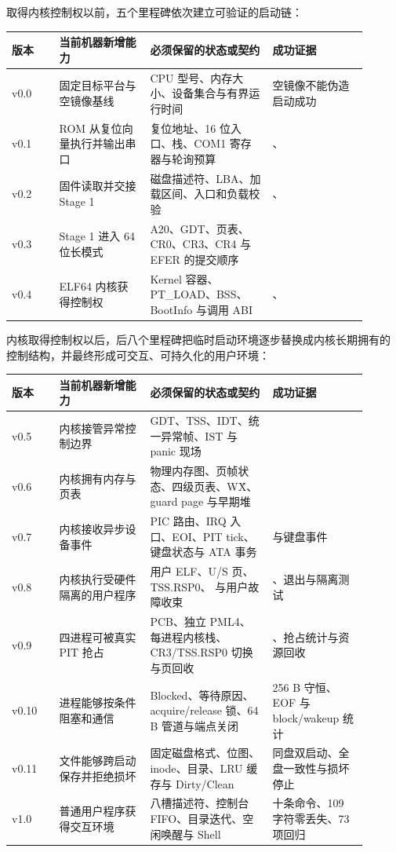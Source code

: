 取得内核控制权以前，五个里程碑依次建立可验证的启动链：

\begin{longtable}{|L{0.12\linewidth}|L{0.23\linewidth}|L{0.31\linewidth}|L{0.24\linewidth}|}
\toprule
版本 & 当前机器新增能力 & 必须保留的状态或契约 & 成功证据 \\
\midrule
v0.0 & 固定目标平台与空镜像基线 & CPU 型号、内存大小、设备集合与有界运行时间 & 空镜像不能伪造启动成功 \\\tablerowrule
v0.1 & ROM 从复位向量执行并输出串口 & 复位地址、16 位入口、栈、COM1 寄存器与轮询预算 & 、 \\\tablerowrule
v0.2 & 固件读取并交接 Stage 1 & 磁盘描述符、LBA、加载区间、入口和负载校验 & 、 \\\tablerowrule
v0.3 & Stage 1 进入 64 位长模式 & A20、GDT、页表、CR0、CR3、CR4 与 EFER 的提交顺序 &  \\\tablerowrule
v0.4 & ELF64 内核获得控制权 & Kernel 容器、PT\_LOAD、BSS、BootInfo 与调用 ABI & 、 \\
\bottomrule
\end{longtable}

内核取得控制权以后，后八个里程碑把临时启动环境逐步替换成内核长期拥有的
控制结构，并最终形成可交互、可持久化的用户环境：

\begin{longtable}{|L{0.12\linewidth}|L{0.23\linewidth}|L{0.31\linewidth}|L{0.24\linewidth}|}
\toprule
版本 & 当前机器新增能力 & 必须保留的状态或契约 & 成功证据 \\
\midrule
v0.5 & 内核接管异常控制边界 & GDT、TSS、IDT、统一异常帧、IST 与 panic 现场 &  \\\tablerowrule
v0.6 & 内核拥有内存与页表 & 物理内存图、页帧状态、四级页表、W\^X、guard page 与早期堆 &  \\\tablerowrule
v0.7 & 内核接收异步设备事件 & PIC 路由、IRQ 入口、EOI、PIT tick、键盘状态与 ATA 事务 &  与键盘事件 \\\tablerowrule
v0.8 & 内核执行受硬件隔离的用户程序 & 用户 ELF、U/S 页、TSS.RSP0、 与用户故障收束 & 、退出与隔离测试 \\\tablerowrule
v0.9 & 四进程可被真实 PIT 抢占 & PCB、独立 PML4、每进程内核栈、CR3/TSS.RSP0 切换与页回收 & 、抢占统计与资源回收 \\\tablerowrule
v0.10 & 进程能够按条件阻塞和通信 & Blocked、等待原因、acquire/release 锁、64 B 管道与端点关闭 & 256 B 守恒、EOF 与 block/wakeup 统计 \\\tablerowrule
v0.11 & 文件能够跨启动保存并拒绝损坏 & 固定磁盘格式、位图、inode、目录、LRU 缓存与 Dirty/Clean & 同盘双启动、全盘一致性与损坏停止 \\\tablerowrule
v1.0 & 普通用户程序获得交互环境 & 八槽描述符、控制台 FIFO、目录迭代、空闲唤醒与 Shell & 十条命令、109 字符零丢失、73 项回归 \\
\bottomrule
\end{longtable}

